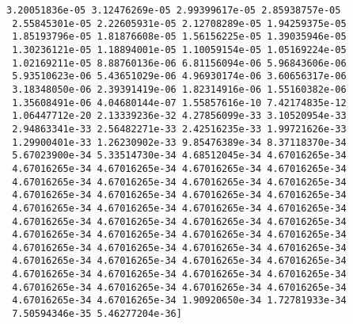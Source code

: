 \documentclass[11pt]{article}
\begin{document}
\begin{Verbatim}[commandchars=\\\{\}]
 3.20051836e-05 3.12476269e-05 2.99399617e-05 2.85938757e-05
 2.55845301e-05 2.22605931e-05 2.12708289e-05 1.94259375e-05
 1.85193796e-05 1.81876608e-05 1.56156225e-05 1.39035946e-05
 1.30236121e-05 1.18894001e-05 1.10059154e-05 1.05169224e-05
 1.02169211e-05 8.88760136e-06 6.81156094e-06 5.96843606e-06
 5.93510623e-06 5.43651029e-06 4.96930174e-06 3.60656317e-06
 3.18348050e-06 2.39391419e-06 1.82314916e-06 1.55160382e-06
 1.35608491e-06 4.04680144e-07 1.55857616e-10 7.42174835e-12
 1.06447712e-20 2.13339236e-32 4.27856099e-33 3.10520954e-33
 2.94863341e-33 2.56482271e-33 2.42516235e-33 1.99721626e-33
 1.29900401e-33 1.26230902e-33 9.85476389e-34 8.37118370e-34
 5.67023900e-34 5.33514730e-34 4.68512045e-34 4.67016265e-34
 4.67016265e-34 4.67016265e-34 4.67016265e-34 4.67016265e-34
 4.67016265e-34 4.67016265e-34 4.67016265e-34 4.67016265e-34
 4.67016265e-34 4.67016265e-34 4.67016265e-34 4.67016265e-34
 4.67016265e-34 4.67016265e-34 4.67016265e-34 4.67016265e-34
 4.67016265e-34 4.67016265e-34 4.67016265e-34 4.67016265e-34
 4.67016265e-34 4.67016265e-34 4.67016265e-34 4.67016265e-34
 4.67016265e-34 4.67016265e-34 4.67016265e-34 4.67016265e-34
 4.67016265e-34 4.67016265e-34 4.67016265e-34 4.67016265e-34
 4.67016265e-34 4.67016265e-34 4.67016265e-34 4.67016265e-34
 4.67016265e-34 4.67016265e-34 4.67016265e-34 4.67016265e-34
 4.67016265e-34 4.67016265e-34 1.90920650e-34 1.72781933e-34
 7.50594346e-35 5.46277204e-36]

\end{Verbatim}
\end{document}
